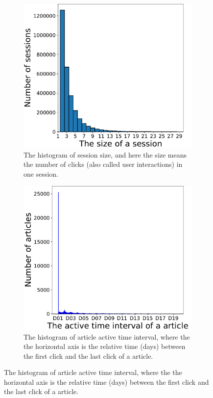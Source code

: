 \begin{figure}[th]
    \begin{subfigure}[t]{0.3\textwidth}
        \includegraphics[height=0.8\textwidth]{fig/data_distribution_a.pdf}
        \caption{The histogram of session size, and here the size means the number of clicks (also called user interactions) in one session.}
    \end{subfigure}
    \qquad
    \begin{subfigure}[t]{0.3\textwidth}
        \includegraphics[height=0.8\textwidth]{fig/data_distribution_b.pdf}
        \caption{The histogram of article active time interval, where the the horizontal axis is the relative time (days) between the first click and the last click of a article.}

\end{subfigure}
\end{figure}
